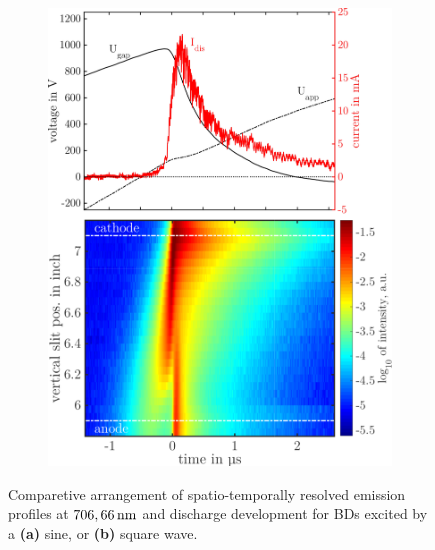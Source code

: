 \documentclass[a4paper,10pt,twoside]{article}
\newcommand{\fett}[1]{\textbf{#1}}
\begin{document}
\begin{figure}
\begin{subfigure}[t]{0.49\textwidth}
					\includegraphics[width=\textwidth]{figures/706nm@square/combination.pdf}
					\caption{}
					\label{img:combsquare}
				\end{subfigure}
				\caption{Comparetive arrangement of spatio-temporally resolved emission profiles at $\unit[706,66]{nm}$ and discharge development for BDs excited by a \fett{(a)} sine, or \fett{(b)} square wave.}
				\label{img:comparisonsinesquare}
			\end{figure}
				
\end{document}
